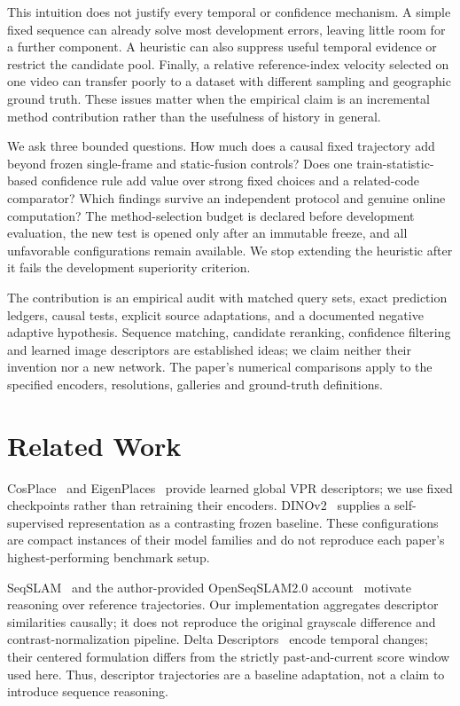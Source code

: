 \documentclass[conference]{IEEEtran}
\begin{document}
This intuition does not justify every temporal or confidence mechanism. A simple fixed sequence can already solve most development errors, leaving little room for a further component. A heuristic can also suppress useful temporal evidence or restrict the candidate pool. Finally, a relative reference-index velocity selected on one video can transfer poorly to a dataset with different sampling and geographic ground truth. These issues matter when the empirical claim is an incremental method contribution rather than the usefulness of history in general.

We ask three bounded questions. How much does a causal fixed trajectory add beyond frozen single-frame and static-fusion controls? Does one train-statistic-based confidence rule add value over strong fixed choices and a related-code comparator? Which findings survive an independent protocol and genuine online computation? The method-selection budget is declared before development evaluation, the new test is opened only after an immutable freeze, and all unfavorable configurations remain available. We stop extending the heuristic after it fails the development superiority criterion.

The contribution is an empirical audit with matched query sets, exact prediction ledgers, causal tests, explicit source adaptations, and a documented negative adaptive hypothesis. Sequence matching, candidate reranking, confidence filtering and learned image descriptors are established ideas; we claim neither their invention nor a new network. The paper's numerical comparisons apply to the specified encoders, resolutions, galleries and ground-truth definitions.

\section{Related Work}
CosPlace~\cite{cosplace} and EigenPlaces~\cite{eigenplaces} provide learned global VPR descriptors; we use fixed checkpoints rather than retraining their encoders. DINOv2~\cite{dinov2} supplies a self-supervised representation as a contrasting frozen baseline. These configurations are compact instances of their model families and do not reproduce each paper's highest-performing benchmark setup.

SeqSLAM~\cite{seqslam} and the author-provided OpenSeqSLAM2.0 account~\cite{openseq} motivate reasoning over reference trajectories. Our implementation aggregates descriptor similarities causally; it does not reproduce the original grayscale difference and contrast-normalization pipeline. Delta Descriptors~\cite{delta} encode temporal changes; their centered formulation differs from the strictly past-and-current score window used here. Thus, descriptor trajectories are a baseline adaptation, not a claim to introduce sequence reasoning.
\end{document}
